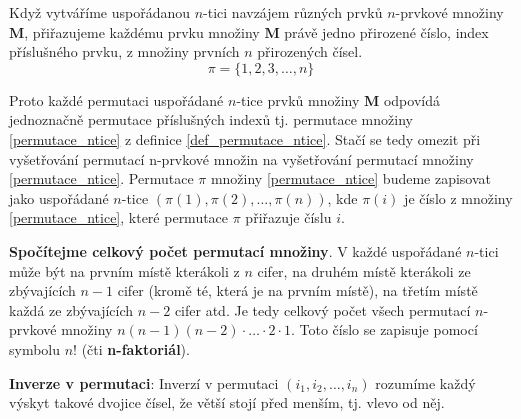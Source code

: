       \begin{definition}\label{def_permutace_ntice}
        Když vytváříme uspořádanou \(n\)-tici navzájem různých prvků \(n\)-prv\-ko\-vé množiny 
        \(\mathbf{M}\), přiřazujeme každému prvku množiny \(\mathbf{M}\) právě jedno přirozené 
        číslo, index příslušného prvku, z množiny prvních \(n\) přirozených čísel.
        \begin{equation}\label{permutace_ntice}
          \pi = \lbrace 1, 2, 3, \ldots, n\rbrace
        \end{equation}
      \end{definition}
  
      Proto každé permutaci uspořádané \(n\)-tice prvků množiny \(\mathbf{M}\) odpovídá jednoznačně 
      permutace příslušných indexů tj. permutace množiny \ref{permutace_ntice} z definice 
      \ref{def_permutace_ntice}. Stačí se tedy omezit při vyšetřování permutací n-prvkové množin 
      na vyšetřování permutací množiny \ref{permutace_ntice}. Permutace \(\pi\) množiny 
      \ref{permutace_ntice} budeme zapisovat jako uspořádané \(n\)-tice \(\left(\pi(1), \pi(2) 
      ,\ldots, \pi(n)\right)\), kde \(\pi(i)\) je číslo z množiny \ref{permutace_ntice}, které 
      permutace \(\pi\) přiřazuje číslu \(i\).

      \begin{example}\label{ex_celk_pocet_permutaci}
        \textbf{Spočítejme celkový počet permutací množiny}. V každé uspořádané \(n\)-tici může být 
        na prvním místě kterákoli z \(n\) cifer, na druhém místě kterákoli ze zbývajících \(n-1\) 
        cifer (kromě té, která je na prvním místě), na  třetím místě každá ze zbývajících \(n-2\) 
        cifer atd. Je tedy celkový počet všech permutací \(n\)-prvkové množiny \(n(n-1)(n-2)\cdot 
        \ldots \cdot2\cdot1\). Toto číslo se zapisuje pomocí symbolu \(n!\) (čti 
        \textbf{n-faktoriál}).
      \end{example}
      
      \begin{definition}\label{def_inv_perm}\textbf{Inverze v permutaci}:
        Inverzí v permutaci \(\left(i_1,i_2,…,i_n \right)\) rozumíme každý výskyt takové dvojice 
        čísel, že větší stojí před menším, tj. vlevo od něj.
      \end{definition}  
   
